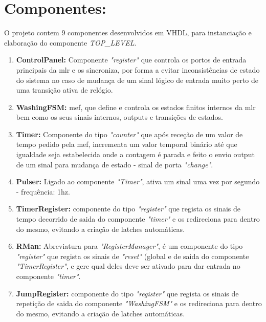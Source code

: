 
\section{Componentes:}
\label{sec.comp}

O projeto contem 9 componentes desenvolvidos em VHDL, para instanciação e elaboração do componente \textit{TOP\_LEVEL}. 
	\begin{enumerate}
	
		\item\textbf{ControlPanel:} Componente \textit{"register"} que controla os portos de entrada principais da \ac{mlr} e os sincroniza, por forma a evitar inconsistências de estado do sistema no caso de mudança de um sinal lógico de entrada muito perto de uma transição ativa de relógio.

		\item\textbf{WashingFSM:} \acf{mef}, que define e controla os estados finitos internos da \ac{mlr} bem como os seus sinais internos, outputs e transições de estados.

		\item\textbf{Timer:} Componente do tipo \textit{"counter"} que após receção de um valor de tempo pedido pela \ac{mef}, incrementa um valor temporal binário até que igualdade seja estabelecida onde a contagem é parada e feito o envio output de um sinal para mudança de estado - sinal de porta \textit{"change"}.

		\item\textbf{Pulser:} Ligado ao componente \textit{"Timer"}, ativa um sinal uma vez por segundo - frequência: 1hz.
		\item\textbf{TimerRegister:} componente do tipo \textit{"register"} que regista os sinais de tempo decorrido de saida do componente \textit{"timer"} e os redireciona para dentro do mesmo, evitando a criação de latches automáticas.
		
		\item\textbf{RMan:} Abreviatura para \textit{"RegisterManager"}, é um componente do tipo \textit{"register"} que regista os sinais de \textit{"reset"} (global e de saida do componente \textit{"TimerRegister"}, e gere qual deles deve ser ativado para dar entrada no componente \textit{"timer"}.

		\item\textbf{JumpRegister:} componente do tipo \textit{"register"} que regista os sinais de repetição de saida do componente \textit{"WashingFSM"} e os redireciona para dentro do mesmo, evitando a criação de latches automáticas.
		

\end{enumerate}
